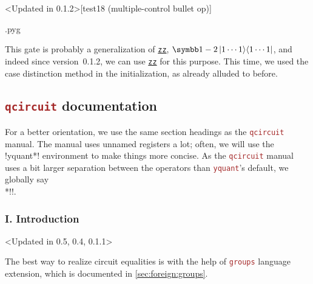\documentclass{scrartcl}
\makeatletter
\newenvironment{codeexample}{%
   \VerbatimEnvironment%
   \let\FVB@VerbatimOut\minted@FVB@VerbatimOut
   \let\FVE@VerbatimOut\minted@FVE@VerbatimOut
   \minted@configlang{tex}%
   \minted@fvset
   \begin{VerbatimOut}[codes={\catcode`\^^I=12},firstline,lastline]{\minted@jobname.pyg}%
}{
   \end{VerbatimOut}%
   \minted@langlinenoson%
   \savebox\codeexamplebox{ \minted@jobname.pyg}%
   \ifdim\wd\codeexamplebox>\dimexpr.5\linewidth-3mm\relax%
      \wd\codeexamplebox=.5\linewidth%
   \else%
      \wd\codeexamplebox=\dimexpr\wd\codeexamplebox+3mm\relax%
   \fi%
   \noindent\begin{minipage}{\wd\codeexamplebox}%
      \centering%
      \usebox\codeexamplebox%
   \end{minipage}%
   \begin{minipage}{\dimexpr\linewidth-\wd\codeexamplebox\relax}%
      \minted@pygmentize{\minted@lang}%
   \end{minipage}%
   \minted@langlinenosoff%
   \par%
}
\newenvironment{codeexample*}{%
   \VerbatimEnvironment%
   \let\FVB@VerbatimOut\minted@FVB@VerbatimOut
   \let\FVE@VerbatimOut\minted@FVE@VerbatimOut
   \minted@configlang{tex}%
   \minted@fvset
   \begin{VerbatimOut}[codes={\catcode`\^^I=12},firstline,lastline]{\minted@jobname.pyg}%
}{
   \end{VerbatimOut}%
   \minted@langlinenoson%
   \begin{adjustbox}{center}
       \minted@jobname.pyg %
   \end{adjustbox}\nopagebreak
   \minted@pygmentize{\minted@lang}%
   \minted@langlinenosoff%
   \par%
}
\def\pkg#1{\textcolor{brown}{\texttt{#1}}}
\def\gate#1{\hyperref[gate:#1]{\texttt{#1}}}
\def\Yquant{\pkg{yquant}}
\def\ketbra#1#2{\ket{#1}\!\bra{#2}}
\makeatother
\begin{document}
         \begin{example}<Updated in 0.1.2>[test18 (multiple-control bullet op)]
            \begin{codeexample}
            \end{codeexample}
            This gate is probably a generalization of \gate{zz}, $\symbb1 - 2 \ketbra{1\dotsm1}{1\dotsm1}$, and indeed since version~0.1.2, we can use \gate{zz} for this purpose.
            This time, we used the case distinction method in the initialization, as already alluded to before.
         \end{example}
      \endgroup

      \clearpage
      \subsection{\pkg{qcircuit} documentation}
      \begingroup%
         For a better orientation, we use the same section headings as the \pkg{qcircuit} manual.
         The manual uses unnamed registers a lot; often, we will use the \tex!yquant*! environment to make things more concise.
         As the \pkg{qcircuit} manual uses a bit larger separation between the operators than \Yquant's default, we globally say\\*\tex!!.

         \subsubsection{I. Introduction}
            \begin{example}<Updated in 0.5, 0.4, 0.1.1>%
               \begin{codeexample*}
\begin{yquantgroup}
   \equals
\end{yquantgroup}
               \end{codeexample*}
               The best way to realize circuit equalities is with the help of \pkg{groups} language extension, which is documented in \cref{sec:foreign:groups}.
            \end{example}
\end{document}
